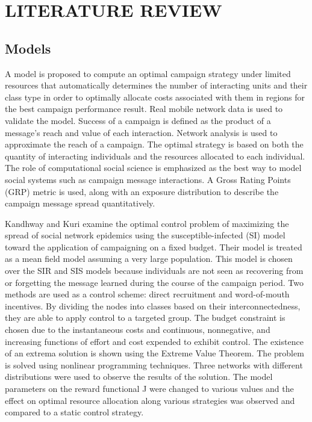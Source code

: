 \chapter{LITERATURE REVIEW}%
\section{Models}
A model is proposed to compute an optimal campaign strategy under limited resources that automatically determines the number of interacting units and their class type in order to optimally allocate costs associated with them in regions for the best campaign performance result. Real mobile network data is used to validate the model. Success of a campaign is defined as the product of a message's reach and value of each interaction. Network analysis is used to approximate the reach of a campaign. The optimal strategy is based on both the quantity of interacting individuals and the resources allocated to each individual. The role of computational social science is emphasized as the best way to model social systems such as campaign message interactions. A Gross Rating Points (GRP) metric is used, along with an exposure distribution to describe the campaign message spread quantitatively. \cite{altshuler2014campaign}

Kandhway and Kuri examine the optimal control problem of maximizing the spread of social network epidemics using the susceptible-infected (SI) model toward the application of campaigning on a fixed budget. Their model is treated as a mean field model assuming a very large population. This model is chosen over the SIR and SIS models because individuals are not seen as recovering from or forgetting the message learned during the course of the campaign period. Two methods are used as a control scheme: direct recruitment and word-of-mouth incentives. By dividing the nodes into classes based on their interconnectedness, they are able to apply control to a targeted group. The budget constraint is chosen due to the instantaneous costs and continuous, nonnegative, and increasing functions of effort and cost expended to exhibit control. The existence of an extrema solution is shown using the Extreme Value Theorem. The problem is solved using nonlinear programming techniques. Three networks with different distributions were used to observe the results of the solution. The model parameters on the reward functional J were changed to various values and the effect on optimal resource allocation along various strategies was observed and compared to a static control strategy. 

